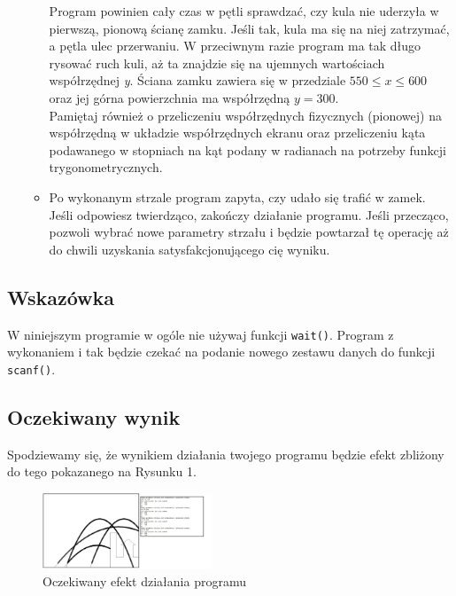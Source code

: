 \documentclass{instrukcja}
\begin{document}
\begin{itemize}
\begin{itemize}
\begin{equation}
\end{equation}
Program powinien cały czas w pętli sprawdzać, czy kula nie uderzyła w pierwszą, pionową ścianę zamku. Jeśli tak, kula ma się na niej zatrzymać, a pętla ulec przerwaniu. W przeciwnym razie program ma tak długo rysować ruch kuli, aż ta znajdzie się na ujemnych wartościach współrzędnej {\it y}. Ściana zamku zawiera się w przedziale \begin{math} 550 \leq x \leq 600 \end{math} oraz jej górna powierzchnia ma współrzędną \begin{math} y = 300 \end{math}.\\
Pamiętaj również o przeliczeniu współrzędnych fizycznych (pionowej) na współrzędną w układzie współrzędnych ekranu oraz przeliczeniu kąta podawanego w stopniach na kąt podany w radianach na potrzeby funkcji trygonometrycznych.
\item Po wykonanym strzale program zapyta, czy udało się trafić w zamek. Jeśli odpowiesz twierdząco, zakończy działanie programu. Jeśli przecząco, pozwoli wybrać nowe parametry strzału i będzie powtarzał tę operację aż do chwili uzyskania satysfakcjonującego cię wyniku.
\end{itemize}
\end {itemize}
\subsection*{Wskazówka}
W niniejszym programie w ogóle nie używaj funkcji {\tt wait()}. Program z wykonaniem i tak będzie czekać na podanie nowego zestawu danych do funkcji {\tt scanf()}.
\subsection*{Oczekiwany wynik}
Spodziewamy się, że wynikiem działania twojego programu będzie efekt zbliżony do tego pokazanego na Rysunku 1.
\begin{figure}
\centering
\includegraphics[width=0.45\textwidth]{zamek2.jpg}
\caption{Oczekiwany efekt działania programu}
\end{figure}
\end{document}
